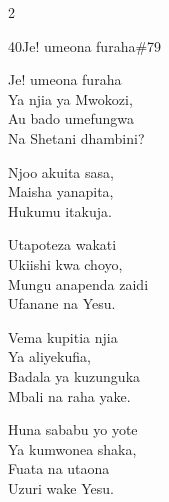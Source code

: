 \begin{multicols}{2}
\begin{hymn}{40}{Je! umeona furaha}{\#79}
\begin{stanza}
Je! umeona furaha\\
Ya njia ya Mwokozi,\\
Au bado umefungwa\\
Na Shetani dhambini?
\end{stanza}
\begin{chorus}
Njoo akuita sasa,\\
Maisha yanapita,\\
Hukumu itakuja.
\end{chorus}
\begin{stanza}
Utapoteza wakati\\
Ukiishi kwa choyo,\\
Mungu anapenda zaidi\\
Ufanane na Yesu.
\end{stanza}
\begin{stanza}
Vema kupitia njia\\
Ya aliyekufia,\\
Badala ya kuzunguka\\
Mbali na raha yake.
\end{stanza}
\begin{stanza}
Huna sababu yo yote\\
Ya kumwonea shaka,\\
Fuata na utaona\\
Uzuri wake Yesu.
\end{stanza}
\end{hymn}


\end{multicols}

